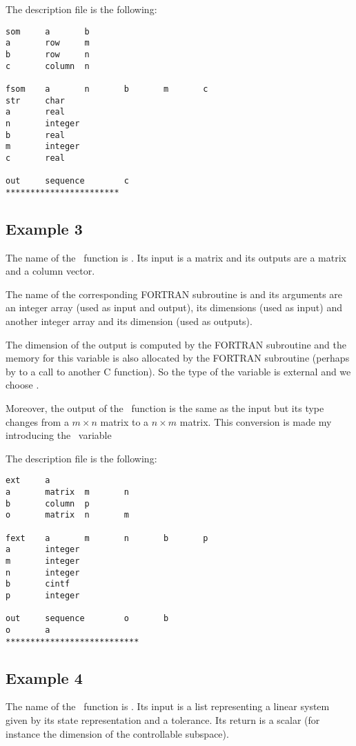 The description file is the following:
\begin{verbatim}
som     a       b
a       row     m
b       row     n
c       column  n

fsom    a       n       b       m       c
str     char
a       real
n       integer
b       real
m       integer
c       real

out     sequence        c
***********************
\end{verbatim}

\subsection{Example 3}
\label{ex3}

The name of the \SCI\ function is . Its input is a matrix and its
outputs are a matrix and a column vector.

The name of the corresponding FORTRAN subroutine is  and its arguments
are an integer array (used as input and output), its dimensions (used as
input) and another integer array and its dimension (used as outputs).

The dimension  of the output  is computed by the FORTRAN subroutine
and the memory for this variable is also allocated by the FORTRAN subroutine
(perhaps by to a call to another C function). So the type of the variable is
external and we choose .

Moreover, the output  of the \SCI\ function is the same as the input
but its type changes from a $m \times n$ matrix to a $n \times m$ matrix. This
conversion is made my introducing the \SCI\ variable 

The description file is the following:
\begin{verbatim}
ext     a
a       matrix  m       n
b       column  p
o       matrix  n       m

fext    a       m       n       b       p
a       integer
m       integer
n       integer
b       cintf
p       integer

out     sequence        o       b
o       a
***************************
\end{verbatim}

\subsection{Example 4}
\label{ex4}

The name of the \SCI\ function is . Its input is a list representing
a linear system given by its state representation and a tolerance. Its return
is a scalar (for instance the dimension of the controllable subspace).

